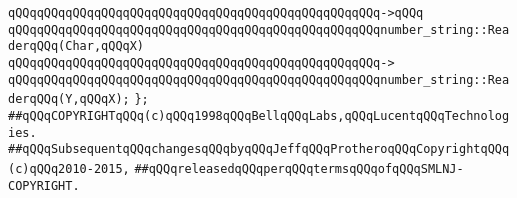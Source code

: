 \verb|qQQqqQQqqQQqqQQqqQQqqQQqqQQqqQQqqQQqqQQqqQQqqQQqqQQq->qQQq|\newline
\verb|qQQqqQQqqQQqqQQqqQQqqQQqqQQqqQQqqQQqqQQqqQQqqQQqqQQqnumber_string::ReaderqQQq(Char,qQQqX)|\newline
\verb|qQQqqQQqqQQqqQQqqQQqqQQqqQQqqQQqqQQqqQQqqQQqqQQqqQQq->|\newline
\verb|qQQqqQQqqQQqqQQqqQQqqQQqqQQqqQQqqQQqqQQqqQQqqQQqqQQqnumber_string::ReaderqQQq(Y,qQQqX);|\newline
\newline
\newline
\verb|};|\newline
\newline
\newline
\newline
\verb|##qQQqCOPYRIGHTqQQq(c)qQQq1998qQQqBellqQQqLabs,qQQqLucentqQQqTechnologies.|\newline
\verb|##qQQqSubsequentqQQqchangesqQQqbyqQQqJeffqQQqProtheroqQQqCopyrightqQQq(c)qQQq2010-2015,|\newline
\verb|##qQQqreleasedqQQqperqQQqtermsqQQqofqQQqSMLNJ-COPYRIGHT.|\newline

